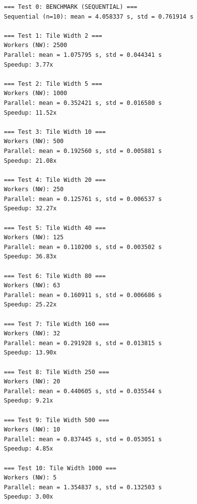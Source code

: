 \documentclass{article}
\newenvironment{answer}
{\par\color{blue}}
{\normalfont\par}
\begin{document}
\begin{enumerate}
\begin{enumerate}
\begin{enumerate}
\begin{answer}
\begin{verbatim}
=== Test 0: BENCHMARK (SEQUENTIAL) ===
Sequential (n=10): mean = 4.058337 s, std = 0.761914 s

=== Test 1: Tile Width 2 ===
Workers (NW): 2500
Parallel: mean = 1.075795 s, std = 0.044341 s
Speedup: 3.77x

=== Test 2: Tile Width 5 ===
Workers (NW): 1000
Parallel: mean = 0.352421 s, std = 0.016580 s
Speedup: 11.52x

=== Test 3: Tile Width 10 ===
Workers (NW): 500
Parallel: mean = 0.192560 s, std = 0.005881 s
Speedup: 21.08x

=== Test 4: Tile Width 20 ===
Workers (NW): 250
Parallel: mean = 0.125761 s, std = 0.006537 s
Speedup: 32.27x

=== Test 5: Tile Width 40 ===
Workers (NW): 125
Parallel: mean = 0.110200 s, std = 0.003502 s
Speedup: 36.83x

=== Test 6: Tile Width 80 ===
Workers (NW): 63
Parallel: mean = 0.160911 s, std = 0.006686 s
Speedup: 25.22x

=== Test 7: Tile Width 160 ===
Workers (NW): 32
Parallel: mean = 0.291928 s, std = 0.013815 s
Speedup: 13.90x

=== Test 8: Tile Width 250 ===
Workers (NW): 20
Parallel: mean = 0.440605 s, std = 0.035544 s
Speedup: 9.21x

=== Test 9: Tile Width 500 ===
Workers (NW): 10
Parallel: mean = 0.837445 s, std = 0.053051 s
Speedup: 4.85x

=== Test 10: Tile Width 1000 ===
Workers (NW): 5
Parallel: mean = 1.354837 s, std = 0.132503 s
Speedup: 3.00x


\end{verbatim}
\end{answer}
\end{enumerate}
\end{enumerate}
\end{enumerate}
\end{document}
